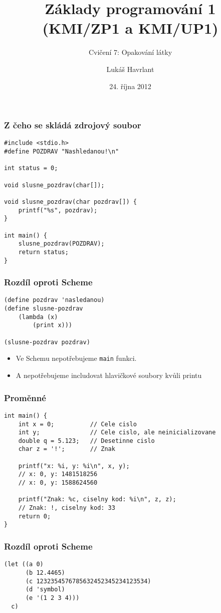 \documentclass{beamer}
\title{Základy programování 1 (KMI/ZP1 a KMI/UP1)}
\subtitle{Cvičení 7: Opakování látky}
\author{Lukáš Havrlant}
\date{24. října 2012}
\institute{Univerzita Palackého}
\newenvironment{itemizex}%
  {\large \begin{itemize}%
    \setlength{\itemsep}{8pt}%
    \setlength{\parskip}{8pt}}%
  {\end{itemize}}
\begin{document}
\begin{frame}[t,plain]
\titlepage
\end{frame}



\begin{frame}[t,fragile]\frametitle{Z čeho se skládá zdrojový soubor} 
\begin{verbatim} 
#include <stdio.h>
#define POZDRAV "Nashledanou!\n"

int status = 0; 

void slusne_pozdrav(char[]);

void slusne_pozdrav(char pozdrav[]) { 
    printf("%s", pozdrav); 
}

int main() {
    slusne_pozdrav(POZDRAV);
    return status;     
}
\end{verbatim}
\end{frame}

\begin{frame}[t,fragile]\frametitle{Rozdíl oproti Scheme} 
\begin{verbatim} 
(define pozdrav 'nasledanou)
(define slusne-pozdrav
    (lambda (x)
        (print x)))

(slusne-pozdrav pozdrav)
\end{verbatim}

\begin{itemizex}
    \item Ve Schemu nepotřebujeme \texttt{main} funkci. 
    \item A nepotřebujeme includovat hlavičkové soubory kvůli printu
\end{itemizex}
\end{frame}


\begin{frame}[t,fragile]\frametitle{Proměnné} 
\begin{verbatim} 
int main() {
    int x = 0;          // Cele cislo
    int y;              // Cele cislo, ale neinicializovane
    double q = 5.123;   // Desetinne cislo
    char z = '!';       // Znak 

    printf("x: %i, y: %i\n", x, y); 
    // x: 0, y: 1481518256
    // x: 0, y: 1588624560

    printf("Znak: %c, ciselny kod: %i\n", z, z);
    // Znak: !, ciselny kod: 33
    return 0;
}
\end{verbatim}
\end{frame}


\begin{frame}[t,fragile]\frametitle{Rozdíl oproti Scheme} 
\begin{verbatim} 
(let ((a 0)
      (b 12.4465)
      (c 1232354576785632452345234123534)
      (d 'symbol)
      (e '(1 2 3 4)))
  c)
\end{verbatim}
\end{frame}
\end{document}
